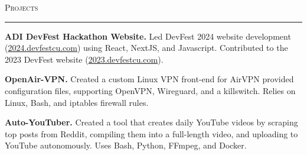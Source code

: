 \documentclass[11pt,letterpaper]{article}
\begin{document}

\medskip
\textsc{\large{Projects}}
\medskip
\hrule
\begin{list}{}{\setlength{\leftmargin}{1em}}
    \item
          \vspace{-1.25em}

    \item \textbf{ADI DevFest Hackathon Website.} {Led DevFest 2024 website development
    (\href{https://2024.devfestcu.com/}{2024.devfestcu.com})} using React, NextJS, and Javascript.
    Contributed to the 2023 DevFest website (\href{https://2023.devfestcu.com/}{2023.devfestcu.com}).
              
    \item \textbf{OpenAir-VPN.} {Created a custom Linux VPN front-end for AirVPN provided configuration files, supporting OpenVPN, Wireguard, and a killswitch. Relies on Linux, Bash, and iptables firewall rules. }

    \item \textbf{Auto-YouTuber.} {Created a tool that creates daily YouTube videos by scraping top posts from Reddit, compiling them into a full-length video, and uploading to YouTube autonomously. Uses Bash, Python, FFmpeg, and Docker. }

\end{list}


\end{document}
